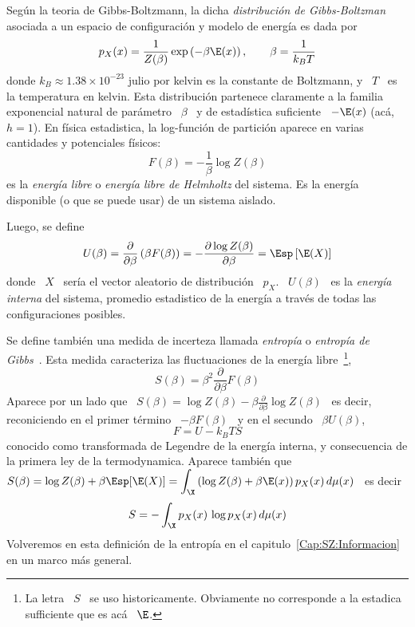 \begin{ejemplo}
  Seg\'un  la  teoria  de  Gibbs-Boltzmann,  la  dicha  {\em  distribuci\'on  de
    Gibbs-Boltzman}  asociada  a  un  espacio  de configuraci\'on  y  modelo  de
  energ\'ia es dada por
  \[
  p_X(x) = \frac{1}{Z(\beta)}  \exp\left( - \beta \E(x) \right),  \qquad \beta =
  \frac{1}{k_B T}
  \]
  donde $k_B \approx  1.38 \times 10^{-23}$ julio por kelvin  es la constante de
  Boltzmann,  y  \ $T$  \  es la  temperatura  en  kelvin.  Esta  distribuci\'on
  partenece claramente a la familia exponencial natural de par\'ametro \ $\beta$
  \  y de  estad\'istica suficiente  \ $-\E(x)$  (ac\'a, $h  = 1$).  En f\'isica
  estadistica, la  log-funci\'on de partici\'on  aparece en varias  cantidades y
  potenciales f\'isicos:
  \[
  F(\beta) = - \frac{1}{\beta} \log Z(\beta)
  \]
  es  la  {\em  energ\'ia  libre}  o  {\em energ\'ia  libre  de  Helmholtz}  del
  sistema.  Es la  energ\'ia disponible  (o  que se  puede usar)  de un  sistema
  aislado.

  Luego, se define
  \[
  U(\beta) =  \frac{\partial}{\partial \beta} \left( \beta F(\beta)  \right) = -
  \frac{\partial \log Z(\beta)}{\partial \beta} = \Esp\left[ \E(X) \right]
  \]
  donde  \  $X$ \  ser\'ia  el  vector aleatorio  de  distribuci\'on  \ $p_X$.   \
  $U(\beta)$ \ es  la {\em energ\'ia interna} del  sistema, promedio estadistico
  de la energ\'ia a trav\'es de todas las configuraciones posibles.

  Se define  tambi\'en una medida de  incerteza llamada {\em  entrop\'ia} o {\em
    entrop\'ia  de  Gibbs}~\cite{Bol77, Bol96,  Bol98,  Gib02, Jay65,  LanLif80,
    MezMon09, Mer10,  Mer18}.  Esta medida  caracteriza las fluctuaciones  de la
  energ\'ia libre~\footnote{La  letra \ $S$ \ se  uso historicamente. Obviamente
    no corresponde a la estadica sufficiente que es ac\'a \ $\E$.},
  \[
  S(\beta) = \beta^2 \frac{\partial}{\partial \beta} F(\beta)
  \]
  Aparece   por   un  lado   que   \  $S(\beta)   =   \log   Z(\beta)  -   \beta
  \frac{\partial}{\partial \beta} \log Z(\beta)$  \ es decir, reconiciendo en el
  primer t\'ermino \ $- \beta F(\beta)$ \ y en el secundo \ $\beta U(\beta)$,
  \[
  F = U - k_B T S
  \]
  conocido como transformada de Legendre de la energ\'ia interna, y consecuencia
  de la  primera ley de  la termodynamica. Aparece tambi\'en  que $\displaystyle
  S(\beta) = \log Z(\beta) + \beta  \Esp[ \E(X) ] = \int_\X \left( \log Z(\beta)
    + \beta \E(x) \right) p_X(x) \, d\mu(x)$ \ es decir
  \[
  S = - \int_\X p_X(x) \, \log p_X(x) \, d\mu(x)
  \]
  Volveremos    en    esta    definici\'on    de    la    entrop\'ia    en    el
  capitulo~\ref{Cap:SZ:Informacion} en un marco m\'as general.
\end{ejemplo}


